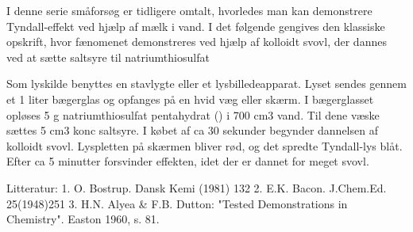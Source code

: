 

I denne serie småforsøg er tidligere omtalt, hvorledes man kan
demonstrere Tyndall-effekt ved hjælp af mælk i vand.
I det følgende gengives den klassiske opskrift, hvor fænomenet
demonstreres ved hjælp af kolloidt svovl, der dannes ved at sætte
saltsyre til natriumthiosulfat

Som lyskilde benyttes en stavlygte eller et lysbilledeapparat. Lyset
sendes gennem et 1 liter bægerglas og opfanges på en hvid væg eller
skærm.
I bægerglasset opløses 5 g natriumthiosulfat pentahydrat
() i 700 cm3 vand. Til dene væske sættes 5 cm3
konc saltsyre.
I købet af ca 30 sekunder begynder dannelsen af kolloidt svovl.
Lyspletten på skærmen bliver rød, og det spredte Tyndall-lys blåt.
Efter ca 5 minutter forsvinder effekten, idet der er dannet for
meget svovl.

Litteratur:
1. O. Bostrup. Dansk Kemi (1981) 132
2. E.K. Bacon. J.Chem.Ed. 25(1948)251
3. H.N. Alyea \& F.B. Dutton: "Tested Demonstrations in Chemistry".
Easton 1960, s. 81.
